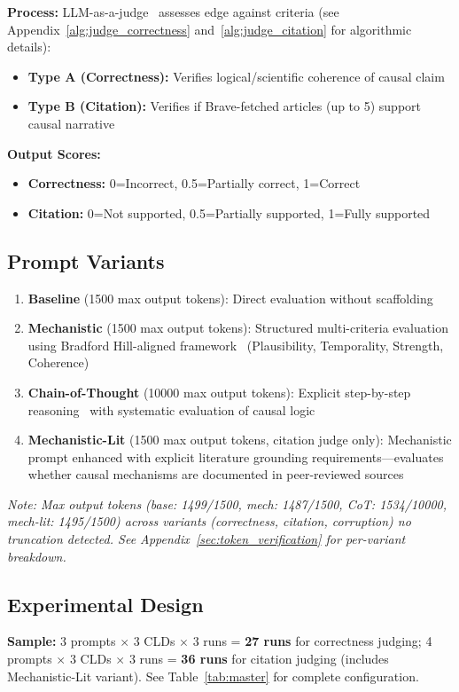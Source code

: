 \textbf{Process:} LLM-as-a-judge~\cite{zheng2024llmasajudge} assesses edge against criteria (see Appendix~\ref{alg:judge_correctness} and~\ref{alg:judge_citation} for algorithmic details):
\begin{itemize}[noitemsep]
    \item \textbf{Type A (Correctness):} Verifies logical/scientific coherence of causal claim
    \item \textbf{Type B (Citation):} Verifies if Brave-fetched articles (up to 5) support causal narrative
\end{itemize}

\textbf{Output Scores:}
\begin{itemize}[noitemsep]
    \item \textbf{Correctness:} 0=Incorrect, 0.5=Partially correct, 1=Correct
    \item \textbf{Citation:} 0=Not supported, 0.5=Partially supported, 1=Fully supported
\end{itemize}

\subsection{Prompt Variants}
\begin{enumerate}[noitemsep]
    \item \textbf{Baseline} (1500 max output tokens): Direct evaluation without scaffolding
    \item \textbf{Mechanistic} (1500 max output tokens): Structured multi-criteria evaluation using Bradford Hill-aligned framework~\cite{shimonovich2020bradford} (Plausibility, Temporality, Strength, Coherence)
    \item \textbf{Chain-of-Thought} (10000 max output tokens): Explicit step-by-step reasoning~\cite{kojima2022large} with systematic evaluation of causal logic
    \item \textbf{Mechanistic-Lit} (1500 max output tokens, citation judge only): Mechanistic prompt enhanced with explicit literature grounding requirements---evaluates whether causal mechanisms are documented in peer-reviewed sources
\end{enumerate}

\textit{Note: Max output tokens (base: 1499/1500, mech: 1487/1500, CoT: 1534/10000, mech-lit: 1495/1500) across variants (correctness, citation, corruption) no truncation detected. See Appendix~\ref{sec:token_verification} for per-variant breakdown.}

\subsection{Experimental Design}
\textbf{Sample:} 3 prompts $\times$ 3 CLDs $\times$ 3 runs = \textbf{27 runs} for correctness judging; 4 prompts $\times$ 3 CLDs $\times$ 3 runs = \textbf{36 runs} for citation judging (includes Mechanistic-Lit variant). See Table~\ref{tab:master} for complete configuration.

